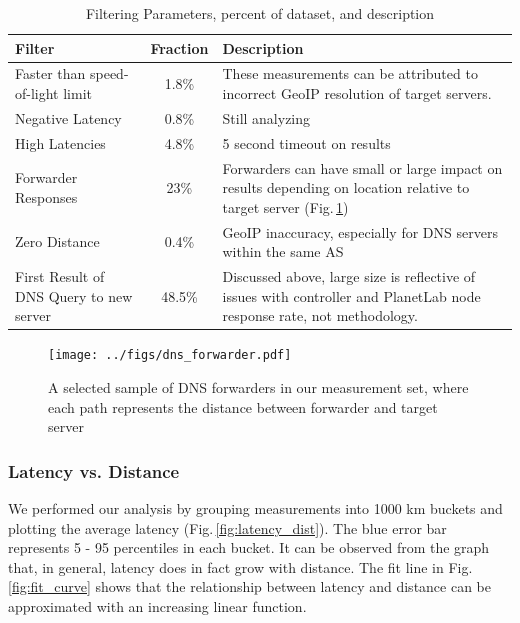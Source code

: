 \begin{table}[!htb]
    \small
  \begin{tabular}{ p{5cm} | c | p{10cm}}
    \hline
    Filter & Fraction & Description \\
    \hline
    Faster than speed-of-light limit & 1.8\% & These measurements can be attributed to incorrect GeoIP resolution of target servers. \\
    \hline
    Negative Latency & 0.8\% & Still analyzing \\
    \hline
    High Latencies & 4.8\% & 5 second timeout on results \\
    \hline
    Forwarder Responses & 23\% & Forwarders can have small or large impact on results depending on location relative to target server (Fig.\,\ref{fig:forwarder_viz}) \\
    \hline
    Zero Distance & 0.4\% & GeoIP inaccuracy, especially for DNS servers within the same AS \\
    \hline
    First Result of DNS Query to new server & 48.5\% & Discussed above, large size is reflective of issues with controller and PlanetLab node response rate, not methodology. \\
    \hline
  \end{tabular}
  \vspace{1em}
  \caption{Filtering Parameters, percent of dataset, and description}
  \label{tab:filter}
\end{table}

\begin{figure}
  \centering
  \texttt{[image: ../figs/dns\_forwarder.pdf]}
  \vspace{-1em}
  \caption{A selected sample of DNS forwarders in our measurement set, where each path represents the distance between forwarder and target server}
  \label{fig:forwarder_viz}
\end{figure}

\subsubsection{Latency vs. Distance}
We performed our analysis by grouping measurements into 1000 km buckets and plotting the average latency (Fig.\,\ref{fig:latency_dist}). The blue error bar represents 5 - 95 percentiles in each bucket. It can be observed from the graph that, in general, latency does in fact grow with distance. The fit line in Fig.\,\ref{fig:fit_curve} shows that the relationship between latency and distance can be approximated with an increasing linear function.

